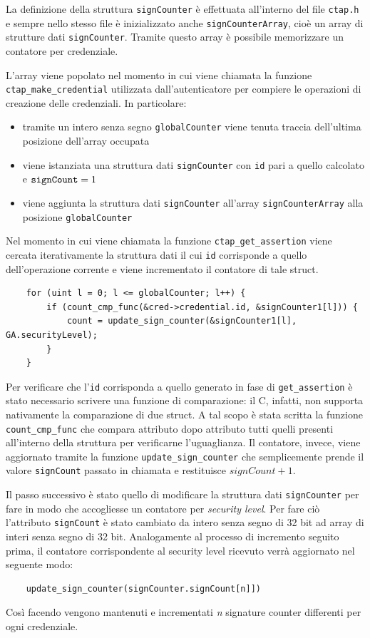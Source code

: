 La definizione della struttura \verb*|signCounter| è effettuata all'interno del file \verb*|ctap.h| e sempre nello stesso file è inizializzato anche \verb*|signCounterArray|, cioè un array di strutture dati \verb*|signCounter|. Tramite questo array è possibile memorizzare un contatore per credenziale. 

L'array viene popolato nel momento in cui viene chiamata la funzione \verb*|ctap_make_credential| utilizzata dall'autenticatore per compiere le operazioni di creazione delle credenziali. In particolare:
\begin{itemize}
	\item tramite un intero senza segno \verb*|globalCounter| viene tenuta traccia dell'ultima posizione dell'array occupata
	\item viene istanziata una struttura dati \verb*|signCounter| con \verb*|id| pari a quello calcolato e $\verb*|signCount| = 1 $
	\item viene aggiunta la struttura dati \verb*|signCounter| all'array \verb*|signCounterArray| alla posizione \verb*|globalCounter|
\end{itemize}

Nel momento in cui viene chiamata la funzione \verb*|ctap_get_assertion| viene cercata iterativamente la struttura dati il cui \verb*|id| corrisponde a quello dell'operazione corrente e viene incrementato il contatore di tale struct. 

\begin{verbatim}
    for (uint l = 0; l <= globalCounter; l++) {
        if (count_cmp_func(&cred->credential.id, &signCounter1[l])) {
            count = update_sign_counter(&signCounter1[l], GA.securityLevel);
        }
    }
\end{verbatim}

Per verificare che l'\verb*|id| corrisponda a quello generato in fase di \verb*|get_assertion| è stato necessario scrivere una funzione di comparazione: il C, infatti, non supporta nativamente la comparazione di due struct. A tal scopo è stata scritta la funzione \verb*|count_cmp_func| che compara attributo dopo attributo tutti quelli presenti all'interno della struttura per verificarne l'uguaglianza.
Il contatore, invece, viene aggiornato tramite la funzione \verb*|update_sign_counter| che semplicemente prende il valore \verb*|signCount| passato in chiamata e restituisce $signCount + 1$.

Il passo successivo è stato quello di modificare la struttura dati \verb*|signCounter| per fare in modo che accogliesse un contatore per \emph{security level}. Per fare ciò l'attributo \verb*|signCount| è stato cambiato da intero senza segno di 32 bit ad array di interi senza segno di 32 bit. Analogamente al processo di incremento seguito prima, il contatore corrispondente al security level ricevuto verrà aggiornato nel seguente modo:
\begin{verbatim}
	update_sign_counter(signCounter.signCount[n]])
\end{verbatim}
Così facendo vengono mantenuti e incrementati \emph{n} signature counter differenti per ogni credenziale. 



